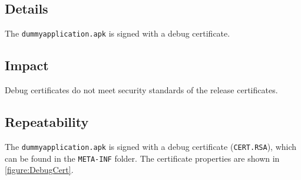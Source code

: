 %
%
%
%
\renewcommand{\FindingAuthor}{}
\renewcommand{\FindingName}{}
\renewcommand{\Location}{}
\renewcommand{\Component}{}
\renewcommand{\FoundWith}{}
\renewcommand{\TestMethod}{}
\renewcommand{\CVSS}{}
\renewcommand{\CVSSvector}{}
\renewcommand{\CWE}{}
\renewcommand{\Criticality}{}
\renewcommand{\Exploitability}{}
\renewcommand{\Category}{}
\renewcommand{\Detectability}{}


\ReportFindingHeader{\FindingName}



\subsection*{Details}

The \texttt{dummyapplication.apk} is signed with a debug certificate.


\subsection*{Impact}

Debug certificates do not meet security standards of the release certificates. 

\pagebreak
\subsection*{Repeatability}

The \texttt{dummyapplication.apk} is signed with a debug certificate (\texttt{CERT.RSA}), which can be found in the \texttt{META-INF} folder.
The certificate properties are shown in \cref{figure:DebugCert}.

